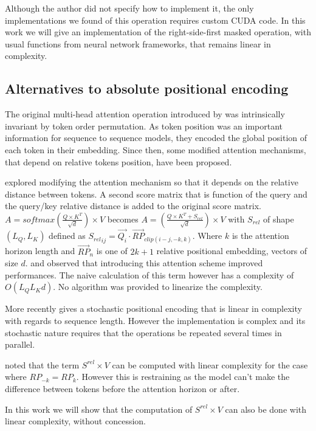 Although the author did not specify how to implement it, the only
 implementations we found of this operation requires custom CUDA code. In
 this work we will give an implementation of the right-side-first masked
operation, with usual functions from neural network frameworks, that
remains linear in complexity.

\subsection{Alternatives to absolute positional
encoding}

The original multi-head attention operation introduced by
\citet{vaswani2017attention} was
intrinsically invariant by token order permutation. As token position was
an important information for sequence to sequence models, they encoded
the global position of each token in their embedding. Since then, some
modified attention mechanisms, that depend on relative tokens position,
have been proposed.

\citet{shaw2018selfattention} explored
modifying the attention mechanism so that it depends on the relative
distance between tokens. A second score matrix that is function of the
query and the query/key relative distance is added to the original score
matrix. $A = softmax\left(\frac{Q \times K^T}{\sqrt{d}}\right) \times V$ becomes
$A = \left(\frac{Q \times K^T + S_{rel}}{\sqrt{d}}\right) \times V$ with $S_{rel}$ of shape $(L_Q, L_K)$ defined as
${S_{rel}}_{ij} = \vec{Q_i} \cdotp \vec{RP}_{clip(i-j, -k, k)}$. Where $k$ is the attention horizon length and $\vec{RP}_n$ is one of
$2k+1$ relative positional embedding, vectors of size $d$.
\citet{shaw2018selfattention} and
\citet{huang2018music} observed that introducing this attention scheme improved performances.
The naive calculation of this term however has a complexity of
$O(L_QL_Kd)$. No algorithm was provided to linearize the complexity.

More recently \citet{liutkus2021relative} gives a stochastic positional encoding that is linear in
complexity with regards to sequence length. However the implementation
is complex and its stochastic nature requires that the operations be
repeated several times in parallel.

\citet{horn2021translational} noted that
the term $S^{rel} \times V$ can be computed with linear complexity for
the case where $RP_{-k} = RP_{k}$. However this is restraining as the
model can't make the difference between tokens before the attention
horizon or after.

In this work we will show that the computation of $S^{rel} \times V$
can also be done with linear complexity, without concession.

\endinput
